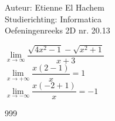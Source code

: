 \documentclass[a4paper]{article}
\begin{document}
  
\noindent \large Auteur: Etienne El Hachem \\
\noindent \large Studierichting: Informatica\\
\noindent \large Oefeningenreeks 2D nr. 20.13\\

\medskip

\normalsize

$\lim\limits_{x\rightarrow \infty}\dfrac{\sqrt{4x^2 - 1} - \sqrt{x^2 + 1}}{x+3}$ \\

$\lim\limits_{x\rightarrow +\infty} \dfrac{x\left(2-1\right)}{x} = 1$ \\

$\lim\limits_{x\rightarrow -\infty} \dfrac{x\left(-2+1\right)}{x} = -1$


\begin{thebibliography}{999}
\end{thebibliography}
\end{document}
